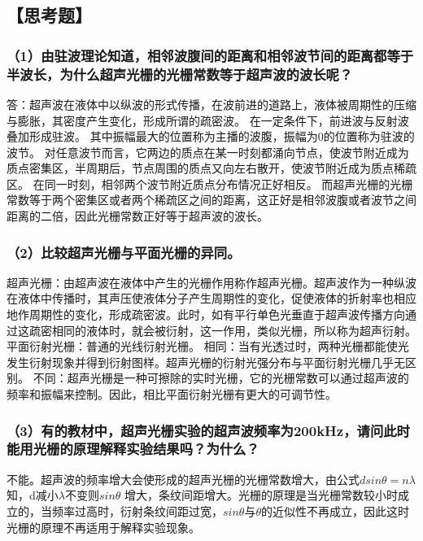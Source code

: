 \documentclass[12pt,a4paper,UTF8]{ctexart}
\begin{document}
\subsection*{【思考题】}
\subsubsection*{（1）由驻波理论知道，相邻波腹间的距离和相邻波节间的距离都等于半波长，为什么超声光栅的光栅常数等于超声波的波长呢？}
答：超声波在液体中以纵波的形式传播，在波前进的道路上，液体被周期性的压缩与膨胀，其密度产生变化，形成所谓的疏密波。
在一定条件下，前进波与反射波叠加形成驻波。
其中振幅最大的位置称为主播的波腹，振幅为0的位置称为驻波的波节。
对任意波节而言，它两边的质点在某一时刻都涌向节点，使波节附近成为质点密集区，半周期后，节点周围的质点又向左右散开，使波节附近成为质点稀疏区。
在同一时刻，相邻两个波节附近质点分布情况正好相反。
而超声光栅的光栅常数等于两个密集区或者两个稀疏区之间的距离，这正好是相邻波腹或者波节之间距离的二倍，因此光栅常数正好等于超声波的波长。

\subsubsection*{（2）比较超声光栅与平面光栅的异同。}
超声光栅：由超声波在液体中产生的光栅作用称作超声光栅。超声波作为一种纵波在液体中传播时，其声压使液体分子产生周期性的变化，促使液体的折射率也相应地作周期性的变化，形成疏密波。此时，如有平行单色光垂直于超声波传播方向通过这疏密相同的液体时，就会被衍射，这一作用，类似光栅，所以称为超声衍射。
平面衍射光栅：普通的光线衍射光栅。
相同：当有光透过时，两种光栅都能使光发生衍射现象并得到衍射图样。超声光栅的衍射光强分布与平面衍射光栅几乎无区别。
不同：超声光栅是一种可擦除的实时光栅，它的光栅常数可以通过超声波的频率和振幅来控制。因此，相比平面衍射光栅有更大的可调节性。

\subsubsection*{（3）有的教材中，超声光栅实验的超声波频率为200kHz，请问此时能用光栅的原理解释实验结果吗？为什么？}
不能。超声波的频率增大会使形成的超声光栅的光栅常数增大，由公式$dsin\theta=n\lambda$知，d减小$\lambda$不变则$sin\theta$ 增大，条纹间距增大。光栅的原理是当光栅常数较小时成立的，当频率过高时，衍射条纹间距过宽，$sin\theta$与$\theta$的近似性不再成立，因此这时光栅的原理不再适用于解释实验现象。
\end{document}

